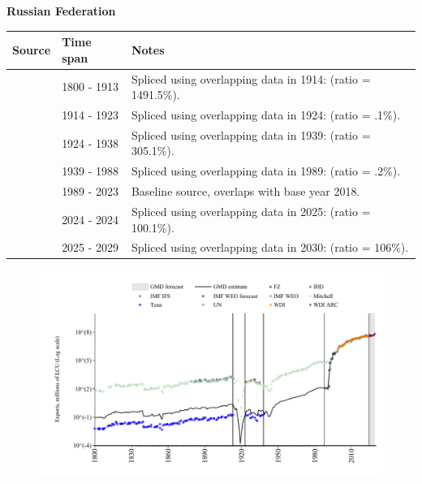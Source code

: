 \documentclass[12pt,a4paper,landscape]{article}
\begin{document}
\begin{adjustbox}{max totalsize={\paperwidth}{\paperheight},center}
\begin{minipage}[t][\textheight][t]{\textwidth}
\vspace*{0.5cm}
{}
\begin{center}
{\Large\bfseries Russian Federation}
\end{center}
\vspace{0.5cm}
\begin{table}[H]
\centering
\small
\begin{tabular}{|l|l|l|}
\hline
\textbf{Source} & \textbf{Time span} & \textbf{Notes} \\
\hline
\rowcolor{white}\cite{Tena}& 1800 - 1913 &Spliced using overlapping data in 1914: (ratio = 1491.5\%).\\
\rowcolor{lightgray}\cite{Mitchell}& 1914 - 1923 &Spliced using overlapping data in 1924: (ratio = .1\%).\\
\rowcolor{white}\cite{Tena}& 1924 - 1938 &Spliced using overlapping data in 1939: (ratio = 305.1\%).\\
\rowcolor{lightgray}\cite{Mitchell}& 1939 - 1988 &Spliced using overlapping data in 1989: (ratio = .2\%).\\
\rowcolor{white}\cite{WDI}& 1989 - 2023 &Baseline source, overlaps with base year 2018.\\
\rowcolor{lightgray}\cite{IMF_IFS}& 2024 - 2024 &Spliced using overlapping data in 2025: (ratio = 100.1\%).\\
\rowcolor{white}\cite{IMF_WEO_forecast}& 2025 - 2029 &Spliced using overlapping data in 2030: (ratio = 106\%).\\
\hline
\end{tabular}
\end{table}
\begin{figure}[H]
\centering
\includegraphics[width=\textwidth,height=0.6\textheight,keepaspectratio]{graphs/RUS_exports.pdf}
\end{figure}
\end{minipage}
\end{adjustbox}
\end{document}
